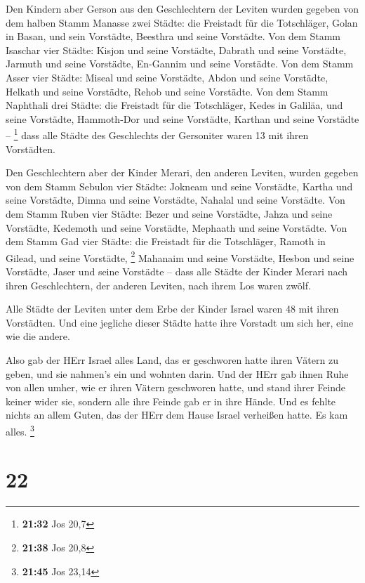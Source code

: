  Den Kindern aber Gerson aus den Geschlechtern der Leviten
wurden gegeben von dem halben Stamm Manasse zwei Städte: die Freistadt
für die Totschläger, Golan in Basan, und sein Vorstädte, Beesthra und
seine Vorstädte.  Von dem Stamm Isaschar vier Städte:
Kisjon und seine Vorstädte, Dabrath und seine Vorstädte, 
Jarmuth und seine Vorstädte, En-Gannim und seine Vorstädte.
 Von dem Stamm Asser vier Städte: Miseal und seine
Vorstädte, Abdon und seine Vorstädte,  Helkath und seine
Vorstädte, Rehob und seine Vorstädte.  Von dem Stamm
Naphthali drei Städte: die Freistadt für die Totschläger, Kedes in
Galiläa, und seine Vorstädte, Hammoth-Dor und seine Vorstädte, Karthan
und seine Vorstädte -- \footnote{\textbf{21:32} Jos 20,7} 
dass alle Städte des Geschlechts der Gersoniter waren 13 mit ihren
Vorstädten.

 Den Geschlechtern aber der Kinder Merari, den anderen
Leviten, wurden gegeben von dem Stamm Sebulon vier Städte: Jokneam und
seine Vorstädte, Kartha und seine Vorstädte,  Dimna und
seine Vorstädte, Nahalal und seine Vorstädte.  Von dem
Stamm Ruben vier Städte: Bezer und seine Vorstädte, Jahza und seine
Vorstädte,  Kedemoth und seine Vorstädte, Mephaath und
seine Vorstädte.  Von dem Stamm Gad vier Städte: die
Freistadt für die Totschläger, Ramoth in Gilead, und seine Vorstädte,
\footnote{\textbf{21:38} Jos 20,8}  Mahanaim und seine
Vorstädte, Hesbon und seine Vorstädte, Jaser und seine Vorstädte --
 dass alle Städte der Kinder Merari nach ihren
Geschlechtern, der anderen Leviten, nach ihrem Los waren zwölf.

 Alle Städte der Leviten unter dem Erbe der Kinder Israel
waren 48 mit ihren Vorstädten.  Und eine jegliche dieser
Städte hatte ihre Vorstadt um sich her, eine wie die andere.

 Also gab der HErr Israel alles Land, das er geschworen
hatte ihren Vätern zu geben, und sie nahmen's ein und wohnten darin.
 Und der HErr gab ihnen Ruhe von allen umher, wie er ihren
Vätern geschworen hatte, und stand ihrer Feinde keiner wider sie,
sondern alle ihre Feinde gab er in ihre Hände.  Und es
fehlte nichts an allem Guten, das der HErr dem Hause Israel verheißen
hatte. Es kam alles. \footnote{\textbf{21:45} Jos 23,14}

\hypertarget{section-11}{%
\section{22}\label{section-11}}

